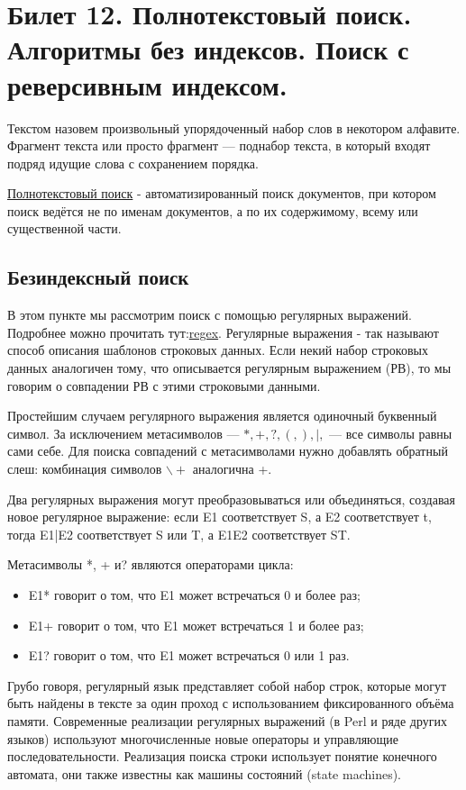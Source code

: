 \newpage
\section {Билет 12. Полнотекстовый поиск. Алгоритмы без индексов. Поиск с реверсивным индексом.}
\begin{defn}
Текстом назовем произвольный упорядоченный набор слов в некотором алфавите. Фрагмент текста или просто фрагмент — поднабор текста, в который входят подряд идущие слова с сохранением порядка. \end{defn}
\href{https://clck.ru/pwwdR}{Полнотекстовый поиск} - автоматизированный поиск документов, при котором поиск ведётся не по именам документов, а по их содержимому, всему или существенной части.

\subsection{Безиндексный поиск}
В этом пункте мы рассмотрим поиск с помощью регулярных выражений. Подробнее можно прочитать тут:\href{https://habr.com/ru/company/vk/blog/270507/}{regex}. Регулярные выражения - так называют способ описания шаблонов строковых данных. Если некий набор строковых данных аналогичен тому, что описывается регулярным выражением (РВ), то мы говорим о совпадении РВ с этими строковыми данными.

Простейшим случаем регулярного выражения является одиночный буквенный символ. За исключением метасимволов — $*, +, ?, (, ),|,$ — все символы равны сами себе. Для поиска совпадений с метасимволами нужно добавлять обратный слеш: комбинация символов $\backslash +$ аналогична +.

Два регулярных выражения могут преобразовываться или объединяться, создавая новое регулярное выражение: если E1 соответствует S, а E2 соответствует t, тогда E1|E2 соответствует S или T, а E1E2 соответствует ST.

Метасимволы *, + и? являются операторами цикла:
\begin {itemize}
\item E1* говорит о том, что E1 может встречаться 0 и более раз;
\item E1+ говорит о том, что E1 может встречаться 1 и более раз;
\item E1? говорит о том, что E1 может встречаться 0 или 1 раз.
\end {itemize}

Грубо говоря, регулярный язык представляет собой набор строк, которые могут быть найдены в тексте за один проход с использованием фиксированного объёма памяти. Современные реализации регулярных выражений (в Perl и ряде других языков) используют многочисленные новые операторы и управляющие последовательности. Реализация поиска строки использует понятие конечного автомата, они также известны как машины состояний (state machines). 

